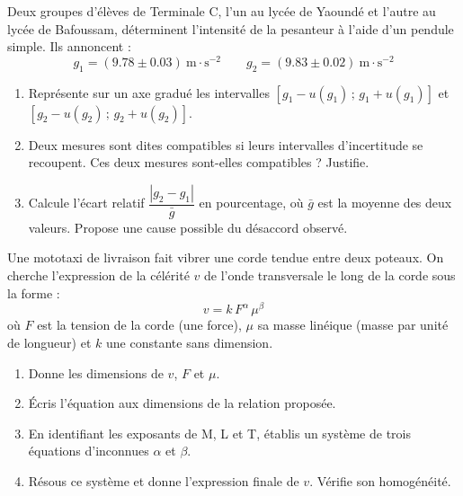 \documentclass[11pt]{article}
\newcommand{\cle}[1]{{\popxbold\color{popdark}#1}}
\newcounter{popsec}
\newcounter{popsub}
\newcommand{\courssub}[1]{%
  \stepcounter{popsub}%
  \par\vspace{9pt}\noindent{\popxbold\fontsize{11.5}{13}\selectfont\color{popink}{\color{poporange}\thepopsec.\thepopsub}\hspace{6pt}#1}\par\nopagebreak\vspace{4pt}
}
\begin{document}
\begin{exercice}
Deux groupes d'élèves de Terminale C, l'un au lycée de Yaoundé et l'autre au lycée de Bafoussam, déterminent l'intensité de la pesanteur à l'aide d'un pendule simple. Ils annoncent :
\[ g_1 = (\num{9,78} \pm \num{0,03})~\text{m}\cdot\text{s}^{-2} \qquad g_2 = (\num{9,83} \pm \num{0,02})~\text{m}\cdot\text{s}^{-2} \]
\begin{enumerate}
    \item Représente sur un axe gradué les intervalles $[g_1 - u(g_1)\,;\,g_1 + u(g_1)]$ et $[g_2 - u(g_2)\,;\,g_2 + u(g_2)]$.
    \item Deux mesures sont dites \cle{compatibles} si leurs intervalles d'incertitude se recoupent. Ces deux mesures sont-elles compatibles ? Justifie.
    \item Calcule l'écart relatif $\dfrac{|g_2 - g_1|}{\bar{g}}$ en pourcentage, où $\bar{g}$ est la moyenne des deux valeurs. Propose une cause possible du désaccord observé.
\end{enumerate}
\end{exercice}

\begin{exercice}
Une mototaxi de livraison fait vibrer une corde tendue entre deux poteaux. On cherche l'expression de la célérité $v$ de l'onde transversale le long de la corde sous la forme :
\[ v = k\,F^{\alpha}\,\mu^{\beta} \]
où $F$ est la tension de la corde (une force), $\mu$ sa masse linéique (masse par unité de longueur) et $k$ une constante sans dimension.
\begin{enumerate}
    \item Donne les dimensions de $v$, $F$ et $\mu$.
    \item Écris l'équation aux dimensions de la relation proposée.
    \item En identifiant les exposants de M, L et T, établis un système de trois équations d'inconnues $\alpha$ et $\beta$.
    \item Résous ce système et donne l'expression finale de $v$. Vérifie son homogénéité.
\end{enumerate}
\end{exercice}

\courssub{Je me prépare au Bac}
\end{document}
